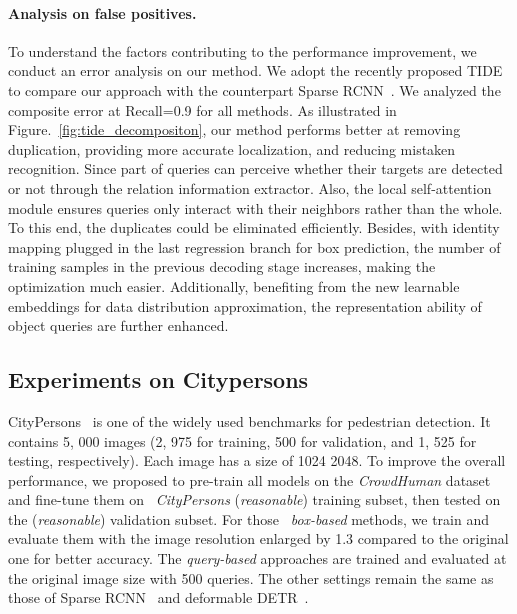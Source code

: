 \documentclass[final]{cvpr}
\begin{document}
\vspace{-0.5cm}
\paragraph{Analysis on false positives.}
To understand the factors contributing to the performance improvement, we conduct an error analysis on our method. We adopt the recently proposed TIDE~\cite{tide-eccv2020} to compare our approach with the counterpart Sparse RCNN~\cite{sun2020sparse}. We analyzed the composite error at Recall=0.9 for all methods. As illustrated in Figure.~\ref{fig:tide_decompositon}, our method performs better at removing duplication, providing more accurate localization, and reducing mistaken recognition. Since part of queries can perceive whether their targets are detected or not through the relation information extractor. Also, the local self-attention module ensures queries only interact with their neighbors rather than the whole. To this end, the duplicates could be eliminated efficiently. Besides, with identity mapping plugged in the last regression branch for box prediction, the number of training samples in the previous decoding stage increases, making the optimization much easier. Additionally, benefiting from the new learnable embeddings for data distribution approximation, the representation ability of object queries are further enhanced.

\vspace{-0.2cm}
\subsection{Experiments on Citypersons}

CityPersons~\cite{zhang2017citypersons} is one of the widely used benchmarks for pedestrian detection. It contains 5, 000 images (2, 975 for training, 500 for validation, and 1, 525 for testing, respectively). Each image has a size of 1024  2048. To improve the overall performance, we proposed to pre-train all models on the \emph{CrowdHuman} dataset and fine-tune them on ~\emph{CityPersons} (\emph{reasonable}) training subset, then tested on the (\emph{reasonable}) validation subset. For those ~\emph{box-based} methods, we train and evaluate them with the image resolution enlarged by 1.3 compared to the original one for better accuracy. The \emph{query-based} approaches are trained and evaluated at the original image size with 500 queries. The other settings remain the same as those of Sparse RCNN~\cite{sun2020sparse} and deformable DETR~\cite{zhu2021deformable}.
\end{document}
